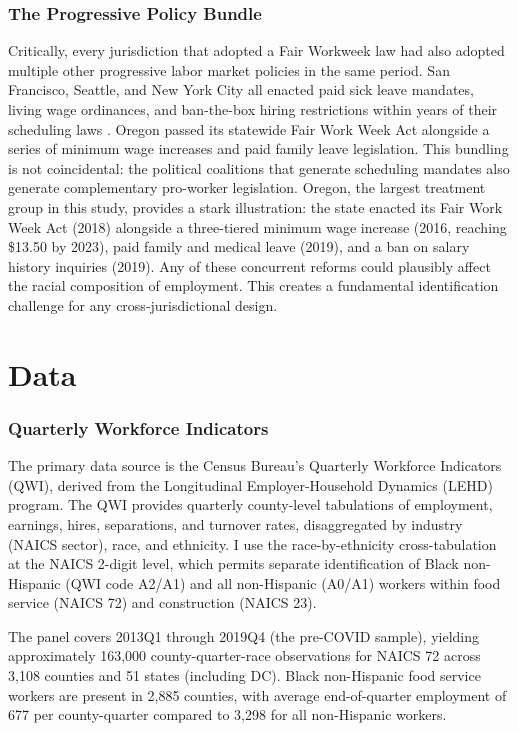 \documentclass[12pt]{article}
\begin{document}
\subsubsection*{The Progressive Policy Bundle} Critically, every jurisdiction that adopted a Fair Workweek law had also adopted multiple other progressive labor market policies in the same period. San Francisco, Seattle, and New York City all enacted paid sick leave mandates, living wage ordinances, and ban-the-box hiring restrictions within years of their scheduling laws \citep{dube2019}. Oregon passed its statewide Fair Work Week Act alongside a series of minimum wage increases and paid family leave legislation. This bundling is not coincidental: the political coalitions that generate scheduling mandates also generate complementary pro-worker legislation. Oregon, the largest treatment group in this study, provides a stark illustration: the state enacted its Fair Work Week Act (2018) alongside a three-tiered minimum wage increase (2016, reaching \$13.50 by 2023), paid family and medical leave (2019), and a ban on salary history inquiries (2019). Any of these concurrent reforms could plausibly affect the racial composition of employment. This creates a fundamental identification challenge for any cross-jurisdictional design.


\section{Data}

\subsubsection*{Quarterly Workforce Indicators} The primary data source is the Census Bureau's Quarterly Workforce Indicators (QWI), derived from the Longitudinal Employer-Household Dynamics (LEHD) program. The QWI provides quarterly county-level tabulations of employment, earnings, hires, separations, and turnover rates, disaggregated by industry (NAICS sector), race, and ethnicity. I use the race-by-ethnicity cross-tabulation at the NAICS 2-digit level, which permits separate identification of Black non-Hispanic (QWI code A2/A1) and all non-Hispanic (A0/A1) workers within food service (NAICS 72) and construction (NAICS 23).

The panel covers 2013Q1 through 2019Q4 (the pre-COVID sample), yielding approximately 163,000 county-quarter-race observations for NAICS 72 across 3,108 counties and 51 states (including DC). Black non-Hispanic food service workers are present in 2,885 counties, with average end-of-quarter employment of 677 per county-quarter compared to 3,298 for all non-Hispanic workers.
\end{document}

